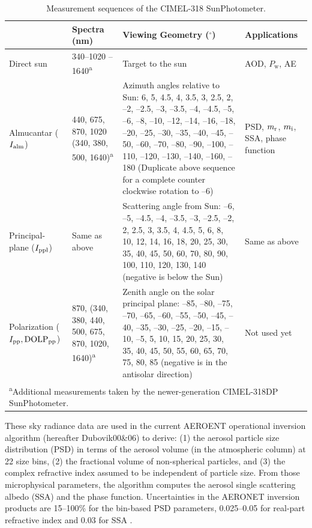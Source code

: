 \begin{table}[t]
  \centering
  \footnotesize
  \caption{Measurement sequences of the CIMEL-318 SunPhotometer.}
  \label{tab:cimel318}
  \begin{tabular}{p{5em} p{8em} p{20em} p{6em} }
    \toprule
           & Spectra (nm)& Viewing Geometry ($^\circ$)& Applications \\ 
    \midrule
    Direct sun & 340--1020 \newline 340--1640\textsuperscript{a} & Target to
the sun & AOD, \newline $P_\text{w}$, AE \\
    \hline
    Almucantar ($I_\text{alm}$)& 440, 675, 870, 1020 \newline (340, 380, 500,
1640)\textsuperscript{a} & Azimuth angles relative to
Sun: 6, 5, 4.5, 4, 3.5, 3, 2.5, 2, --2, --2.5, --3, --3.5, --4, --4.5, --5, --6,
--8, --10, --12, --14, --16, --18, --20, --25, --30, --35, --40, --45, --50,
--60, --70, --80, --90, --100, --110, --120, --130, --140, --160, --180
(Duplicate above sequence for a complete counter clockwise rotation to --6) & 
PSD, \newline $m_\text{r}$, $m_\text{i}$, \newline SSA, \newline phase function\\
    \hline
    Principal-plane ($I_\text{ppl}$)& Same as above & Scattering angle from
Sun: --6, --5, --4.5, --4, --3.5, --3, --2.5, --2, 2, 2.5, 3, 3.5, 4, 4.5, 5,
6, 8, 10, 12, 14, 16, 18, 20, 25, 30, 35, 40, 45, 50, 60, 70, 80, 90, 100, 110, 
120, 130, 140 (negative is below the Sun) & Same as above \\
    \hline
    Polarization ($I_\text{pp}, \text{DOLP}_\text{pp}$) & 870, \newline (340, 380, 440, 500, 675, 870, 1020,
1640)\textsuperscript{a} & Zenith angle on the
solar principal plane: --85, --80, --75, --70, --65, --60, --55, --50, --45,
--40, --35, --30, --25, --20, --15, --10, --5, 5, 10, 15, 20, 25, 30, 35, 40, 
45, 50, 55, 60, 65, 70, 75, 80, 85 (negative is in the antisolar direction) &
Not used yet \\
    \bottomrule
     \multicolumn{4}{m{35em}}{\textsuperscript{a}Additional measurements taken
by the newer-generation CIMEL-318DP SunPhotometer.}
  \end{tabular}
\end{table}

These sky radiance data are used in the current AEROENT operational inversion
algorithm \citep{Dubovik00a,Dubovik06} (hereafter Dubovik00\&06) to derive: 
(1) the aerosol particle size distribution (PSD) in
terms of the aerosol volume (in the atmospheric column) at 22 size bins, (2)
the fractional volume of non-spherical particles, and (3) the complex
refractive index assumed to be independent of particle size. From
those microphysical parameters, the \Dub algorithm computes the aerosol
single scattering albedo (SSA) and the phase function. Uncertainties in
the AERONET inversion products are 15--100\% for the bin-based PSD parameters,
0.025--0.05 for real-part refractive index and 0.03 for SSA \citep{Dubovik00b}.

